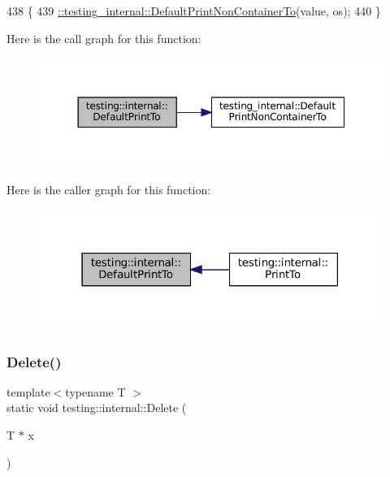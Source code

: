 \begin{DoxyCode}
438                                                     \{
439   \hyperlink{namespacetesting__internal_a3f49d3d0c996242f9d383c850097a656}{::testing\_internal::DefaultPrintNonContainerTo}(value, os);
440 \}
\end{DoxyCode}
Here is the call graph for this function\+:
\nopagebreak
\begin{figure}[H]
\begin{center}
\leavevmode
\includegraphics[width=350pt]{namespacetesting_1_1internal_a78e4937ba564f01dac2ff25f3eece0ec_cgraph}
\end{center}
\end{figure}
Here is the caller graph for this function\+:
\nopagebreak
\begin{figure}[H]
\begin{center}
\leavevmode
\includegraphics[width=316pt]{namespacetesting_1_1internal_a78e4937ba564f01dac2ff25f3eece0ec_icgraph}
\end{center}
\end{figure}
\mbox{\label{namespacetesting_1_1internal_a1e7045e09392aece10aea4517458b7ed}} 
\subsubsection{\texorpdfstring{Delete()}{Delete()}}
{\footnotesize\ttfamily template$<$typename T $>$ \\
static void testing\+::internal\+::\+Delete (\begin{DoxyParamCaption}\item[{T $\ast$}]{x }\end{DoxyParamCaption})\hspace{0.3cm}{\ttfamily [static]}}



